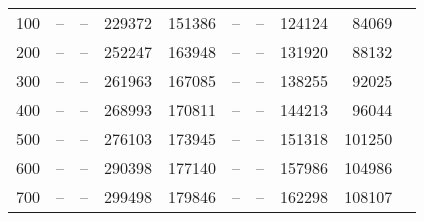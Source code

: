 \documentclass[utf8]{frontiersSCNS} %
\begin{document}
\begin{table*}[htp]
\begin{tabular}{|r|r|r|r|r|r|r|r|r|r|}
   100& --      & --      &  229372   & 151386 &  --    &  --   & 124124 & 84069  \\
   200& --      & --      &  252247   & 163948 &  --    &  --   & 131920 & 88132  \\
   300& --      & --      &  261963   & 167085 &  --    &  --   & 138255 & 92025  \\
   400& --      & --      &  268993   & 170811 &  --    &  --   & 144213 & 96044  \\
   500& --      & --      &  276103   & 173945 &  --    &  --   & 151318 & 101250 \\
   600& --      & --      &  290398   & 177140 &  --    &  --   & 157986 & 104986 \\
   700& --      & --      &  299498   & 179846 &  --    &  --   & 162298 & 108107 \\
   \hline
  \end{tabular}
\end{table*}
\end{document}
